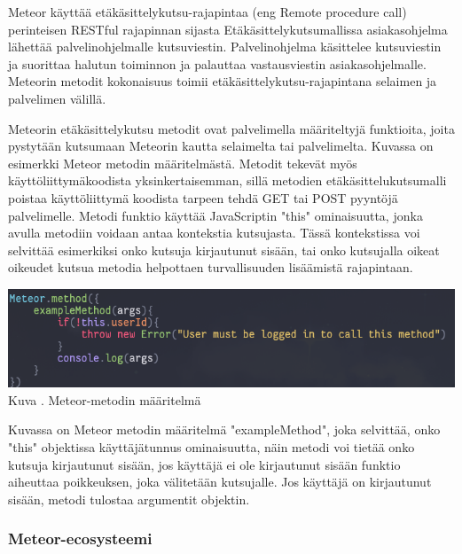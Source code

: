 


Meteor käyttää etäkäsittelykutsu-rajapintaa (eng Remote procedure call) perinteisen RESTful rajapinnan sijasta
Etäkäsittelykutsumallissa asiakasohjelma lähettää palvelinohjelmalle kutsuviestin.
Palvelinohjelma käsittelee kutsuviestin ja suorittaa halutun toiminnon ja palauttaa vastausviestin asiakasohjelmalle.
Meteorin metodit kokonaisuus toimii etäkäsittelykutsu-rajapintana selaimen ja palvelimen välillä. 
\medskip



Meteorin etäkäsittelykutsu metodit ovat palvelimella määriteltyjä funktioita, joita pystytään kutsumaan Meteorin kautta selaimelta tai palvelimelta. 
Kuvassa \nextImageCount{} on esimerkki Meteor metodin määritelmästä.
Metodit tekevät myös käyttöliittymäkoodista yksinkertaisemman, 
sillä metodien etäkäsittelukutsumalli poistaa käyttöliittymä koodista tarpeen tehdä GET tai POST pyyntöjä palvelimelle.
Metodi funktio käyttää JavaScriptin "this"{} ominaisuutta, jonka
avulla metodiin voidaan antaa kontekstia kutsujasta.
Tässä kontekstissa voi selvittää esimerkiksi onko kutsuja kirjautunut sisään, tai onko kutsujalla oikeat oikeudet kutsua metodia helpottaen turvallisuuden lisäämistä rajapintaan.
\bigskip

\includegraphics[width=15cm]{src/public/methodexample.png}\\
Kuva \getImgCount {}. Meteor-metodin määritelmä
\medskip

Kuvassa on Meteor metodin määritelmä "exampleMethod"{}, joka selvittää, onko "this"{} objektissa käyttäjätunnus ominaisuutta, 
näin metodi voi tietää onko kutsuja kirjautunut sisään,
jos käyttäjä ei ole kirjautunut sisään funktio aiheuttaa poikkeuksen, joka välitetään kutsujalle.
Jos käyttäjä on kirjautunut sisään, metodi tulostaa argumentit objektin. 
\medskip




\subsubsection{Meteor-ecosysteemi}

